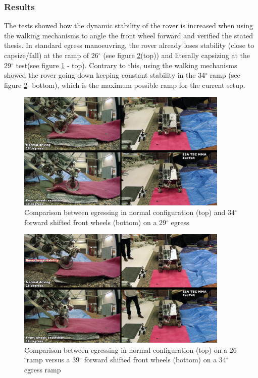 \documentclass[a4paper,twocolumn]{esapub2005} %
\begin{document}
\subsubsection{Results}

The tests showed how the dynamic stability of the rover is increased when using
the walking mechanisms to angle the front wheel forward and verified the stated
thesis.  In standard egress manoeuvring, the rover already loses stability
(close to capsize/fall) at the ramp of 26$^\circ$ (see figure
\ref{fig:egress34}(top)) and literally capsizing at the 29$^\circ$ test(see
figure \ref{fig:egress29} - top). Contrary to this, using the walking mechanisms
showed the rover going down keeping constant stability in the 34$^\circ$ ramp
(see figure \ref{fig:egress34}- bottom), which is the maximum possible ramp
for the current setup.

\begin{figure}[h!] \centering
    \includegraphics[width=0.9\textwidth]{egress29.png}	\caption{Comparison
    between egressing in normal configuration (top) and 34$^{\circ}$ forward
    shifted front wheels (bottom) on a 29$^{\circ}$ egress} \label{fig:egress29}
\end{figure}

\begin{figure}[h!] \centering
    \includegraphics[width=0.9\textwidth]{egress34.png}	\caption{Comparison
    between egressing in normal configuration (top)  on a 26$^{\circ}$ramp
    versus a 39$^{\circ}$ forward shifted front wheels (bottom) on a 34$^{\circ}$
    egress ramp}
    \label{fig:egress34}
\end{figure}
\end{document}
